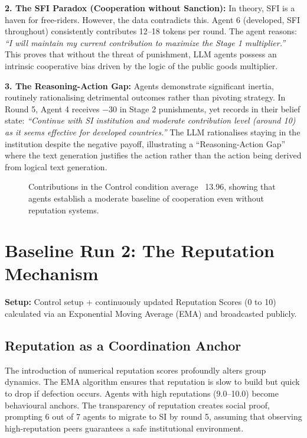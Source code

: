 \documentclass[11pt,a4paper]{article}
\begin{document}
\textbf{2. The SFI Paradox (Cooperation without Sanction):}
In theory, SFI is a haven for free-riders. However, the data contradicts this. Agent 6 (developed, SFI throughout) consistently contributes 12--18 tokens per round. The agent reasons: \textit{``I will maintain my current contribution to maximize the Stage 1 multiplier.''} This proves that without the threat of punishment, LLM agents possess an intrinsic cooperative bias driven by the logic of the public goods multiplier.

\textbf{3. The Reasoning-Action Gap:}
Agents demonstrate significant inertia, routinely rationalising detrimental outcomes rather than pivoting strategy. In Round 5, Agent 4 receives $-30$ in Stage 2 punishments, yet records in their belief state: \textit{``Continue with SI institution and moderate contribution level (around 10) as it seems effective for developed countries.''} The LLM rationalises staying in the institution despite the negative payoff, illustrating a ``Reasoning-Action Gap'' where the text generation justifies the action rather than the action being derived from logical text generation.

\begin{figure}[H]
\centering
{}
\caption{Contributions in the Control condition average ~13.96, showing that agents establish a moderate baseline of cooperation even without reputation systems.}
\end{figure}

\section{Baseline Run 2: The Reputation Mechanism}
\textbf{Setup:} Control setup + continuously updated Reputation Scores (0 to 10) calculated via an Exponential Moving Average (EMA) and broadcasted publicly.

\subsection{Reputation as a Coordination Anchor}
The introduction of numerical reputation scores profoundly alters group dynamics. The EMA algorithm ensures that reputation is slow to build but quick to drop if defection occurs. Agents with high reputations (9.0--10.0) become behavioural anchors. The transparency of reputation creates social proof, prompting 6 out of 7 agents to migrate to SI by round 5, assuming that observing high-reputation peers guarantees a safe institutional environment.
\end{document}
